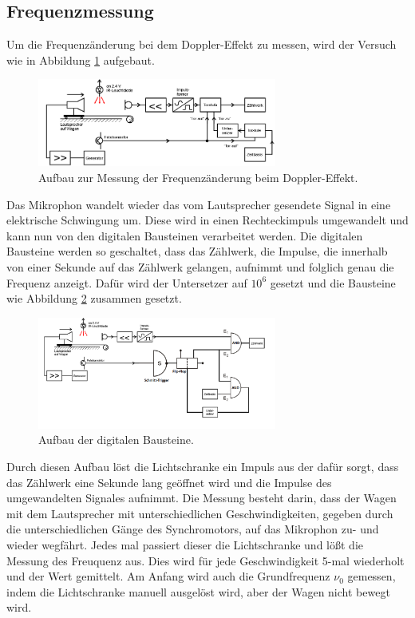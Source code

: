 \subsection{Frequenzmessung}
\label{sec:Frequenzmessung}
Um die Frequenzänderung bei dem Doppler-Effekt zu messen,
wird der Versuch wie in Abbildung \ref{abb:Frequenzdiff} aufgebaut.
\begin{figure}
\centering
\includegraphics[width=0.7\textwidth]{Frequenzmessung.PNG}
\caption{Aufbau zur Messung der Frequenzänderung beim Doppler-Effekt.\cite{skript}}
\label{abb:Frequenzdiff}
\end{figure} \FloatBarrier
Das Mikrophon wandelt wieder das vom Lautsprecher
gesendete Signal in eine elektrische Schwingung um.
Diese wird in einen Rechteckimpuls umgewandelt und
kann nun von den digitalen
Bausteinen verarbeitet werden.
Die digitalen Bausteine werden so geschaltet,
dass das Zählwerk, die Impulse, die innerhalb
von einer Sekunde auf das Zählwerk gelangen, aufnimmt und
folglich genau die Frequenz anzeigt.
Dafür wird der Untersetzer auf $10^6$ gesetzt
und die Bausteine wie Abbildung \ref{abb:digitalF} zusammen gesetzt.
\begin{figure}
\centering
\includegraphics[width=0.7\textwidth]{digitalebausteile.png}
\caption{Aufbau der digitalen Bausteine.}
\label{abb:digitalF}
\end{figure}
\FloatBarrier
Durch diesen Aufbau löst die Lichtschranke ein Impuls
aus der dafür sorgt, dass das Zählwerk eine Sekunde
lang geöffnet wird und die Impulse des umgewandelten
Signales aufnimmt.
Die Messung besteht darin, dass der Wagen mit
dem Lautsprecher mit unterschiedlichen Geschwindigkeiten,
gegeben durch die unterschiedlichen Gänge des Synchromotors,
auf das Mikrophon zu- und
wieder  wegfährt. Jedes mal passiert dieser
die Lichtschranke und lößt die Messung des
Freuquenz aus. Dies wird für jede Geschwindigkeit
5-mal wiederholt und der Wert gemittelt. Am Anfang wird
auch die Grundfrequenz $\nu_{0}$ gemessen, indem die
Lichtschranke manuell ausgelöst wird, aber der Wagen nicht bewegt wird.
